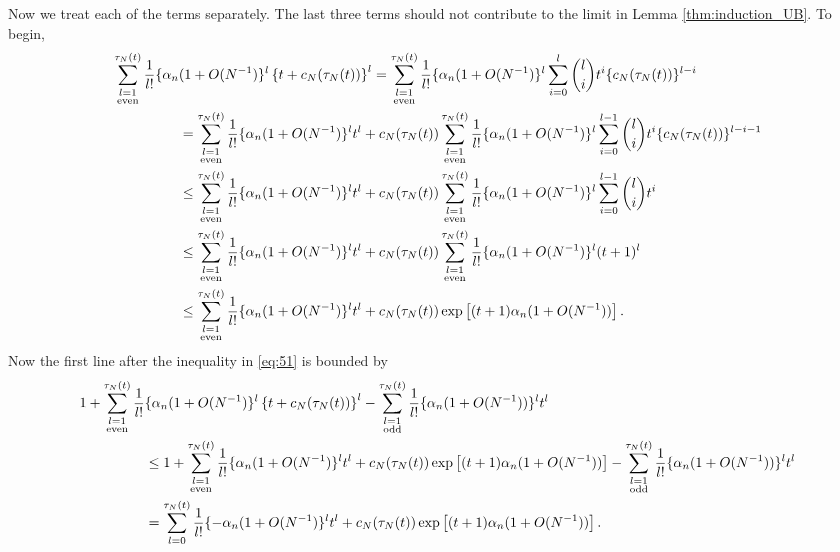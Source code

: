 \documentclass{article}
\newcommand{\1}[1]{\mathbbm{1}_{#1}}
\begin{document}
Now we treat each of the terms separately. The last three terms should not contribute to the limit in Lemma \ref{thm:induction_UB}. 
To begin,
\begin{align}
\sum_{\substack{l=1\\\text{even}}}^{\tau_N(t)} \frac{1}{l!} \{\alpha_n &(1+O(N^{-1})\}^l \left\{ t + c_N(\tau_N(t)) \right\}^l
= \sum_{\substack{l=1\\\text{even}}}^{\tau_N(t)} \frac{1}{l!} \{\alpha_n(1+O(N^{-1})\}^l \sum_{i=0}^l \binom{l}{i} t^i \{c_N(\tau_N(t))\}^{l-i} \notag\\
&= \sum_{\substack{l=1\\\text{even}}}^{\tau_N(t)} \frac{1}{l!} \{\alpha_n(1+O(N^{-1})\}^l t^l
+ c_N(\tau_N(t)) \sum_{\substack{l=1\\\text{even}}}^{\tau_N(t)} \frac{1}{l!} \{\alpha_n(1+O(N^{-1})\}^l \sum_{i=0}^{l-1} \binom{l}{i} t^i \{c_N(\tau_N(t))\}^{l-i-1} \notag\\
&\leq \sum_{\substack{l=1\\\text{even}}}^{\tau_N(t)} \frac{1}{l!} \{\alpha_n(1+O(N^{-1})\}^l t^l
+ c_N(\tau_N(t)) \sum_{\substack{l=1\\\text{even}}}^{\tau_N(t)} \frac{1}{l!} \{\alpha_n(1+O(N^{-1})\}^l \sum_{i=0}^{l-1} \binom{l}{i} t^i \notag\\
&\leq \sum_{\substack{l=1\\\text{even}}}^{\tau_N(t)} \frac{1}{l!} \{\alpha_n(1+O(N^{-1})\}^l t^l
+ c_N(\tau_N(t)) \sum_{\substack{l=1\\\text{even}}}^{\tau_N(t)} \frac{1}{l!} \{\alpha_n(1+O(N^{-1})\}^l (t+1)^l \notag\\
&\leq \sum_{\substack{l=1\\\text{even}}}^{\tau_N(t)} \frac{1}{l!} \{\alpha_n(1+O(N^{-1})\}^l t^l
+ c_N(\tau_N(t)) \exp \left[ (t+1) \alpha_n (1+O(N^{-1})) \right] .
\end{align}
Now the first line after the inequality in \eqref{eq:51} is bounded by
\begin{align}
1 + \sum_{\substack{l=1\\\text{even}}}^{\tau_N(t)} \frac{1}{l!} &\{\alpha_n(1+O(N^{-1})\}^l \left\{ t + c_N(\tau_N(t)) \right\}^l
- \sum_{\substack{l=1\\\text{odd}}}^{\tau_N(t)} \frac{1}{l!} \{\alpha_n (1+O(N^{-1}))\}^l t^l \notag\\
&\leq 1 + \sum_{\substack{l=1\\\text{even}}}^{\tau_N(t)} \frac{1}{l!} \{\alpha_n(1+O(N^{-1})\}^l t^l
+ c_N(\tau_N(t)) \exp \left[ (t+1) \alpha_n (1+O(N^{-1})) \right]
- \sum_{\substack{l=1\\\text{odd}}}^{\tau_N(t)} \frac{1}{l!} \{\alpha_n (1+O(N^{-1}))\}^l t^l \notag\\
&= \sum_{l=0}^{\tau_N(t)} \frac{1}{l!} \{ -\alpha_n(1+O(N^{-1})\}^l t^l
+ c_N(\tau_N(t)) \exp \left[ (t+1) \alpha_n (1+O(N^{-1})) \right] . \label{eq:53}
\end{align} 
\end{document}
